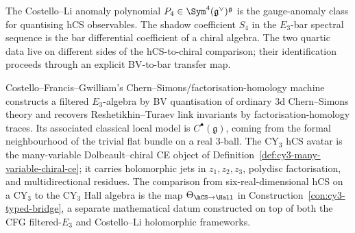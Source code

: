 \begin{remark}
\label{rem:cy3-quartic-anomaly-vs-shadow}
The Costello--Li anomaly polynomial
$P_4 \in \Sym^4(\mathfrak g^\vee)^{\mathfrak g}$ is the gauge-anomaly
class for quantising hCS observables. The shadow coefficient $S_4$ in
the $E_3$-bar spectral sequence is the bar differential coefficient of
a chiral algebra. The two quartic data live on different sides of the
hCS-to-chiral comparison; their identification proceeds through an
explicit BV-to-bar transfer map.
\end{remark}

\begin{remark}
\label{rem:cy3-no-cfg-shortcut}
Costello--Francis--Gwilliam's Chern--Simons/factorisation-homology
machine~\cite{CFG2026} constructs a filtered $E_3$-algebra by BV
quantisation of ordinary $3$d Chern--Simons theory and recovers
Reshetikhin--Turaev link invariants by factorisation-homology traces.
Its associated classical local model is $C^\bullet(\mathfrak g)$,
coming from the formal neighbourhood of the trivial flat bundle on a
real $3$-ball. The CY$_3$ hCS avatar is the many-variable
Dolbeault--chiral CE object of
Definition~\ref{def:cy3-many-variable-chiral-ce}; it carries
holomorphic jets in $z_1, z_2, z_3$, polydisc factorisation, and
multidirectional residues. The comparison from six-real-dimensional
hCS on a CY$_3$ to the CY$_3$ Hall algebra is the map
$\Theta_{\hCS \to \Hall}$ in Construction~\ref{con:cy3-typed-bridge},
a separate mathematical datum constructed on top of both the CFG
filtered-$E_3$ and Costello--Li holomorphic frameworks.
\end{remark}

